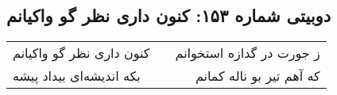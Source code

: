 \begin{center}
\section*{دوبیتی شماره ۱۵۳: کنون داری نظر گو واکیانم}
\label{sec:153}
\begin{longtable}{l p{0.5cm} r}
کنون داری نظر گو واکیانم
&&
ز جورت در گدازه استخوانم
\\
بکه اندیشه‌ای بیداد پیشه
&&
که آهم تیر بو ناله کمانم
\\
\end{longtable}
\end{center}
